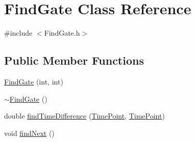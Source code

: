 \hypertarget{classFindGate}{}\section{Find\+Gate Class Reference}
\label{classFindGate}


{\ttfamily \#include $<$Find\+Gate.\+h$>$}

\subsection*{Public Member Functions}
\begin{DoxyCompactItemize}
\item 
\hyperlink{classFindGate_a2ecdab312288376cc4322dffe2c3eda7}{Find\+Gate} (int, int)
\item 
\hyperlink{classFindGate_ae4bc3021eab556eb048e0c60ac21e35a}{$\sim$\+Find\+Gate} ()
\item 
double \hyperlink{classFindGate_abce66efcd84add5565a4a60e696eb2a0}{find\+Time\+Difference} (\hyperlink{thruster__driver_8cpp_ad3e807c387dc076de974ff7eac67ad81}{Time\+Point}, \hyperlink{thruster__driver_8cpp_ad3e807c387dc076de974ff7eac67ad81}{Time\+Point})
\item 
void \hyperlink{classFindGate_ab6a173a3ec0bdebb810f1a93edc9600a}{find\+Next} ()
\end{DoxyCompactItemize}

